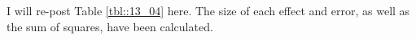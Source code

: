 \documentclass{ltjbook}
\begin{document}
I will re-post Table \ref{tbl::13_04} here. The size of each effect and error, as well as the sum of squares, have been calculated.




\end{document}
